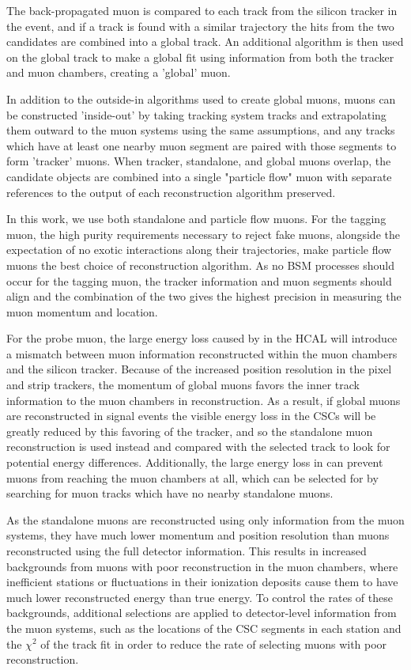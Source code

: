 The back-propagated muon is compared to each track from the silicon tracker in the event, and if a track is found with a similar trajectory the hits from the two candidates are combined into a global track.
An additional \kf algorithm is then used on the global track to make a global fit using information from both the tracker and muon chambers, creating a 'global' muon. 

In addition to the outside-in algorithms used to create global muons, muons can be constructed 'inside-out' by taking tracking system tracks and extrapolating them outward to the muon systems using the same assumptions, and any tracks which have at least one nearby muon segment are paired with those segments to form 'tracker' muons. 
When tracker, standalone, and global muons overlap, the candidate objects are combined into a single "particle flow" muon with separate references to the output of each reconstruction algorithm preserved.

In this work, we use both standalone and particle flow muons. 
For the tagging muon, the high purity requirements necessary to reject fake muons, alongside the expectation of no exotic interactions along their trajectories, make particle flow muons the best choice of reconstruction algorithm. 
As no BSM processes should occur for the tagging muon, the tracker information and muon segments should align and the combination of the two gives the highest precision in measuring the muon momentum and location. 

For the probe muon, the large energy loss caused by \dbrem in the HCAL will introduce a mismatch between muon information reconstructed within the muon chambers and the silicon tracker. 
Because of the increased position resolution in the pixel and strip trackers, the momentum of global muons favors the inner track information to the muon chambers in reconstruction.
As a result, if global muons are reconstructed in signal events the visible energy loss in the CSCs will be greatly reduced by this favoring of the tracker, and so the standalone muon reconstruction is used instead and compared with the selected track to look for potential energy differences.
Additionally, the large energy loss in \dbrem can prevent muons from reaching the muon chambers at all, which can be selected for by searching for muon tracks which have no nearby standalone muons.

As the standalone muons are reconstructed using only information from the muon systems, they have much lower momentum and position resolution than muons reconstructed using the full detector information. 
This results in increased backgrounds from muons with poor reconstruction in the muon chambers, where inefficient stations or fluctuations in their ionization deposits cause them to have much lower reconstructed energy than true energy. 
To control the rates of these backgrounds, additional selections are applied to detector-level information from the muon systems, such as the locations of the CSC segments in each station and the $\chi^2$ of the track fit in order to reduce the rate of selecting muons with poor reconstruction.
